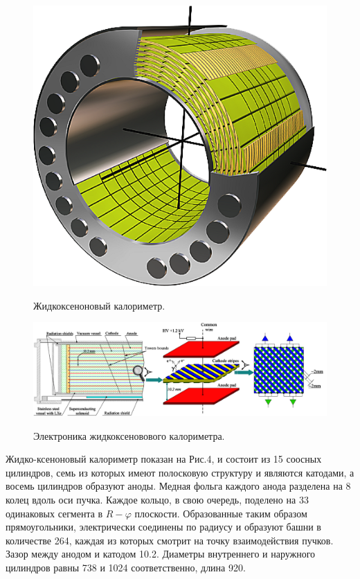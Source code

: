 \begin{figure}[htbp]
    \begin{minipage}[t]{0.27\textwidth}
        \centering
        \includegraphics[width=\textwidth]{img/cmd3_detector/lxe_sketch.png}
        \label{fig:lxe_sketch}
        \caption{Жидкоксеноновый калориметр.}
    \end{minipage}
    \hfill
    \begin{minipage}[t]{0.68\textwidth}
        \centering
        \includegraphics[width=\textwidth]{img/cmd3_detector/lxe_electrode_structure.png}
        \label{lxe_electrode_structure}
        \caption{Электроника жидкоксеновового калориметра.}
  \end{minipage}
\end{figure}

Жидко-ксеноновый калориметр показан на Рис.4, и состоит из 15 соосных цилиндров,
семь из которых имеют полосковую структуру и являются катодами,
а восемь цилиндров образуют аноды.
Медная фольга каждого анода разделена на 8 колец вдоль оси пучка.
Каждое кольцо, в свою очередь,
поделено на \num{33} одинаковых сегмента в $R-\varphi$ плоскости. 
Образованные таким образом прямоугольники,
электрически соединены по радиусу и образуют башни в количестве \num{264}, каждая из которых смотрит на точку взаимодействия пучков.
Зазор между анодом и катодом \SI{10.2}{\mmr}.
Диаметры внутреннего и наружного цилиндров равны \SI{738}{\mmr} и \SI{1024}{\mmr} соответственно,
длина \SI{920}{\mmr}. 

